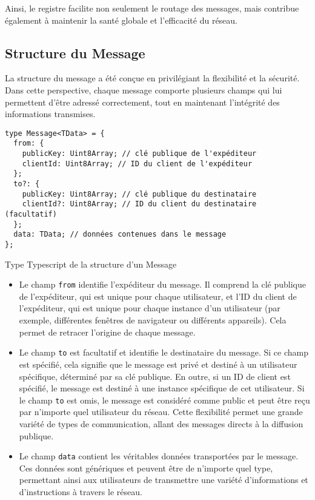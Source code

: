 Ainsi, le registre facilite non seulement le routage des messages, mais contribue également à maintenir la santé globale et l'efficacité du réseau.

\subsection{Structure du Message}

La structure du message a été conçue en privilégiant la flexibilité et la sécurité. Dans cette perspective, chaque message comporte plusieurs champs qui lui permettent d'être adressé correctement, tout en maintenant l'intégrité des informations transmises.

\begin{listing}[H]
  \begin{verbatim}
type Message<TData> = {
  from: {
    publicKey: Uint8Array; // clé publique de l'expéditeur
    clientId: Uint8Array; // ID du client de l'expéditeur
  };
  to?: {
    publicKey: Uint8Array; // clé publique du destinataire
    clientId?: Uint8Array; // ID du client du destinataire (facultatif)
  };
  data: TData; // données contenues dans le message
};
\end{verbatim}
  \caption{Type Typescript de la structure d'un Message}
\end{listing}

\begin{itemize}
  \item Le champ \texttt{from} identifie l'expéditeur du message. Il comprend la clé publique de l'expéditeur, qui est unique pour chaque utilisateur, et l'ID du client de l'expéditeur, qui est unique pour chaque instance d'un utilisateur (par exemple, différentes fenêtres de navigateur ou différents appareils). Cela permet de retracer l'origine de chaque message.
  \item Le champ \texttt{to} est facultatif et identifie le destinataire du message. Si ce champ est spécifié, cela signifie que le message est privé et destiné à un utilisateur spécifique, déterminé par sa clé publique. En outre, si un ID de client est spécifié, le message est destiné à une instance spécifique de cet utilisateur. Si le champ \texttt{to} est omis, le message est considéré comme public et peut être reçu par n'importe quel utilisateur du réseau. Cette flexibilité permet une grande variété de types de communication, allant des messages directs à la diffusion publique.
  \item Le champ \texttt{data} contient les véritables données transportées par le message. Ces données sont génériques et peuvent être de n'importe quel type, permettant ainsi aux utilisateurs de transmettre une variété d'informations et d'instructions à travers le réseau.
\end{itemize}

